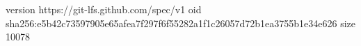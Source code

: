 version https://git-lfs.github.com/spec/v1
oid sha256:e5b42c73597905e65afea7f297f6f55282a1f1c26057d72b1ea3755b1e34e626
size 10078
